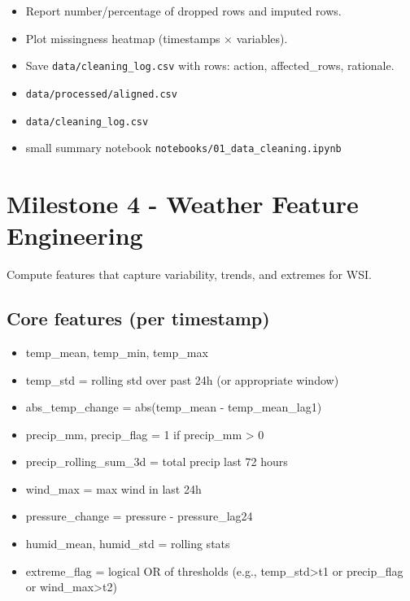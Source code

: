 \documentclass[11pt,a4paper]{article}
\begin{document}
\begin{checkbox}
\begin{itemize}
    \item Report number/percentage of dropped rows and imputed rows.
    \item Plot missingness heatmap (timestamps × variables).
    \item Save \texttt{data/cleaning\_log.csv} with rows: action, affected\_rows, rationale.
\end{itemize}
\end{checkbox}

\begin{deliverablebox}
\begin{itemize}
    \item \texttt{data/processed/aligned.csv}
    \item \texttt{data/cleaning\_log.csv}
    \item small summary notebook \texttt{notebooks/01\_data\_cleaning.ipynb}
\end{itemize}
\end{deliverablebox}

\section{Milestone 4 - Weather Feature Engineering}

\begin{objectivebox}
Compute features that capture variability, trends, and extremes for WSI.
\end{objectivebox}

\subsection{Core features (per timestamp)}
\begin{itemize}
    \item temp\_mean, temp\_min, temp\_max
    \item temp\_std = rolling std over past 24h (or appropriate window)
    \item abs\_temp\_change = abs(temp\_mean - temp\_mean\_lag1)
    \item precip\_mm, precip\_flag = 1 if precip\_mm > 0
    \item precip\_rolling\_sum\_3d = total precip last 72 hours
    \item wind\_max = max wind in last 24h
    \item pressure\_change = pressure - pressure\_lag24
    \item humid\_mean, humid\_std = rolling stats
    \item extreme\_flag = logical OR of thresholds (e.g., temp\_std>t1 or precip\_flag or wind\_max>t2)
\end{itemize}
\end{document}
